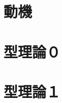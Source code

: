 \documentclass[dvipdfmx]{jsarticle}
\begin{document}
\section{動機}


\newpage
\section{型理論０}


\newpage
\section{型理論１}

\newpage

\end{document}
